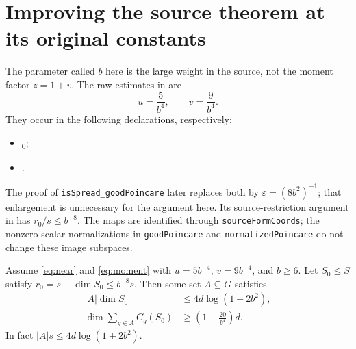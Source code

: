 \section{Improving the source theorem at its original constants}
\label{sec:source-improvement}

The parameter called \(b\) here is the large weight in the source,
not the moment factor \(z=1+v\). The raw estimates in
are
\[
 u=\frac5{b^4},\qquad v=\frac9{b^4}.
\]
They occur in the following declarations, respectively:
\begin{itemize}
\item {}\textsubscript{0};
\item {}.
\end{itemize}
The proof of \texttt{isSpread\_goodPoincare} later replaces both
by \(\varepsilon=(8b^2)^{-1}\); that enlargement is unnecessary
for the argument here. Its source-restriction argument in
has \(r_0/s\le b^{-8}\). The maps are identified through
\texttt{sourceFormCoords}; the nonzero scalar normalizations in
\texttt{goodPoincare} and \texttt{normalizedPoincare} do not change
these image subspaces.

\begin{theorem}\label{thm:source}
Assume \eqref{eq:near} and \eqref{eq:moment} with
\(u=5b^{-4}\), \(v=9b^{-4}\), and \(b\ge6\).
Let \(S_0\le S\) satisfy \(r_0=s-\dim S_0\le b^{-8}s\).
Then some set \(A\subseteq G\) satisfies
\begin{align}
 |A|\dim S_0&\le 4d\log(1+2b^2),\label{eq:sourcecount}\\
 \dim\sum_{g\in A}C_g(S_0)&\ge
 \left(1-\frac{20}{b^4}\right)d.\label{eq:sourcerank}
\end{align}
In fact \(|A|s\le4d\log(1+2b^2)\).
\end{theorem}


